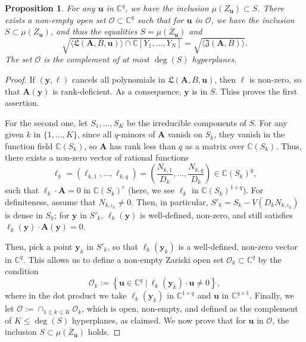 \documentclass[12pt]{article}
\def\X{S}
\def\frkJ{\mathfrak{J}}
\def\frkL{\mathfrak{L}}
\def\mA{{\bm A}}
\def\C{\mathbb{C}}
\newtheorem{prop}[theorem]{Proposition}
\begin{document}
\begin{prop}\label{prop:projection}
  For any $\bm u$ in $\C^q$, we have the inclusion $\mu(Z_{\bm u})
  \subset \X$. There exists a non-empty open set $\mathscr{O} \subset
  \C^q$ such that for $\bm u$ in $\mathscr{O}$, we have the inclusion
  $\X \subset \overline{\mu(Z_{\bm u})}$, and thus the equalities $\X =
  \overline{\mu(Z_{\bm u})}$ and 
  \[\sqrt{\langle \frkL(\bm A, B,\bm u)\rangle\cap \C[Y_1,\dots,Y_N]} = 
  \sqrt{\langle \frkJ(\bm A, B) \rangle}.\]
  The set $\mathscr{O}$ is the complement of at most $\deg(\X)$ 
  hyperplanes.
\end{prop}
\begin{proof}
  If $(\bm y, \bm \ell)$ cancels all polynomials in ${\frkL(\bm A,
    B,\bm u)}$, then $\bm \ell$ is non-zero, so that $\bm A(\bm y)$ is
  rank-deficient. As a consequence, $\bm y$ is in $\X$. Thiss proves
  the first assertion.

  For the second one, let $\X_1,\dots,\X_K$ be the irreducible
  components of $\X$.  For any given $k$ in $\{1,\dots,K\}$, since all
  $q$-minors of $\mA$ vanish on $\X_k$, they vanish in the function
  field $\C(\X_k)$, so $\mA$ has rank less than $q$ as a matrix over
  $\C(\X_k)$. Thus, there exists a non-zero vector of rational
  functions
  \[\bm \ell_k = (\ell_{k,1},\hdots,\ell_{k,q})=\left(\frac{N_{k,1}}{D_k},\hdots,\frac{N_{k,q}}{D_k}\right)\in \C(\X_k)^{ q},\]
  such that $\bm \ell_k  \cdot \bm A = 0$ in $\C(\X_k)^r$ 
(here, we see $\bm \ell_k$ in $\C(\X_k)^{1 \times q}$).
  For definiteness, assume that $N_{k,\iota_k} \ne 0.$ Then, in particular,
  $\X'_k = \X_k - V( D_k N_{k,\iota_k})$ is dense in $\X_k$; for 
  $\bm y$ in $\X'_k$, $\bm\ell_k(\bm y)$ is well-defined, non-zero, and still
  satisfies $\bm \ell_k(\bm y) \cdot \bm A(\bm y) = 0$.
  
  Then, pick a point $\bm y_k$ in $\X'_k$, so that
  $\bm \ell_k(\bm y_k)$ is a well-defined, non-zero vector in
  $\C^q$. This allows us to define a non-empty Zariski open set
  $\mathscr{O}_k \subset \C^q$ by the condition
  \[
  \mathscr{O}_k := 
  \left\{\bm u \in \C^q~|~ \bm \ell_k(\bm y_k) \cdot \bm u \ne 0\right \},
  \]
  where in the dot product we take $\bm \ell_k(\bm y_k)$ in $\C^{1 \times q}$ and $\bm u$ in
  $\C^{q \times 1}$.  Finally, we let $\mathscr{O} := \cap_{1 \le k
    \le K} \mathscr{O}_{k}$, which is open, non-empty, and defined 
  as the complement of $K \le \deg(\X)$ hyperplanes, as claimed. We now prove
  that for $\bm u$ in $\mathscr{O}$, the inclusion $\X \subset
  \overline{\mu(Z_{\bm u})}$ holds.


\end{proof}
\end{document}

